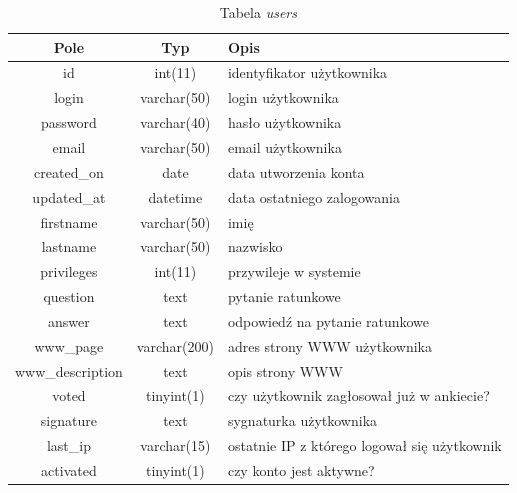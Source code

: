 \documentclass[a4paper,12pt,oneside]{report}
\begin{document}
\begin{table}[h]
  \centering
  \begin{tabular}{|c|c|l|}\hline
  Pole & Typ & Opis \\\hline
  id              & int(11)      & identyfikator użytkownika \\
  login           & varchar(50)  & login użytkownika \\
  password        & varchar(40)  & hasło użytkownika \\
  email           & varchar(50)  & email użytkownika \\
  created\_on      & date         & data utworzenia konta \\
  updated\_at      & datetime     & data ostatniego zalogowania\\
  firstname       & varchar(50)  & imię \\
  lastname        & varchar(50)  & nazwisko \\
  privileges      & int(11)      & przywileje w systemie \\
  question        & text         & pytanie ratunkowe \\
  answer          & text         & odpowiedź na pytanie ratunkowe \\
  www\_page        & varchar(200) & adres strony WWW użytkownika\\
  www\_description & text         & opis strony WWW \\
  voted           & tinyint(1)   & czy użytkownik zagłosował już w ankiecie? \\
  signature       & text         & sygnaturka użytkownika \\
  last\_ip         & varchar(15)  & ostatnie IP z którego logował się użytkownik \\
  activated       & tinyint(1)   & czy konto jest aktywne? \\\hline
  \end{tabular}
  \caption{Tabela \emph{users}\label{tab:users}}
\end{table}
\end{document}
